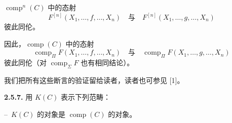 $\operatorname{comp}^{n}(C)$ 中的态射
\begin{equation*}
  F^{[n]}(X_1,\ldots,f,\ldots,X_n)
  \quad\text{与}\quad
  F^{[n]}(X_1,\ldots,g,\ldots,X_n)
\end{equation*}
彼此同伦。

因此，$\operatorname{comp}(C)$ 中的态射
\begin{equation*}
  \operatorname{comp}_{\Pi}F(X_1,\ldots,f,\ldots,X_n)
  \quad\text{与}\quad
  \operatorname{comp}_{\Pi}F(X_1,\ldots,g,\ldots,X_n)
\end{equation*}
彼此同伦（对 $\operatorname{comp}_{\Sigma}F$ 也有相同结论）。

我们把所有这些断言的验证留给读者，读者也可参见 [1]。

\noindent\textbf{2.5.7.}\quad
用 $K(C)$ 表示下列范畴：

\noindent\hspace*{2em}--\ $K(C)$ 的对象是 $\operatorname{comp}(C)$ 的对象。
